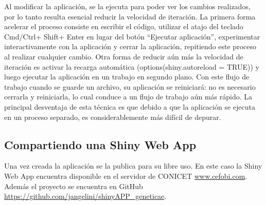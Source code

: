 Al modificar la aplicación, se la ejecuta para poder ver los cambios realizados, por lo tanto resulta esencial reducir la velocidad de iteración. La primera forma acelerar el proceso consiste en escribir el código, utilizar el atajo del teclado Cmd/Ctrl+ Shift+ Enter en lugar del botón ``Ejecutar aplicación'', experimentar interactivamente con la aplicación y cerrar la aplicación, repitiendo este proceso al realizar cualquier cambio. Otra forma de reducir aún más la velocidad de iteración es activar la recarga automática (options(shiny.autoreload = TRUE)) y luego ejecutar la aplicación en un trabajo en segundo plano. Con este flujo de trabajo cuando se guarde un archivo, su aplicación se reiniciará: no es necesario cerrarla y reiniciarla, lo cual conduce a un flujo de trabajo aún más rápido. La principal desventaja de esta técnica es que debido a que la aplicación se ejecuta en un proceso separado, es considerablemente más difícil de depurar.


\subsection{Compartiendo una Shiny Web App}

Una vez creada la aplicación se la publica para su libre uso. En este caso la Shiny Web App encuentra disponible en el servidor de CONICET \url{www.cefobi.com}. Además el proyecto se encuentra en GitHub \url{https://github.com/jangelini/shinyAPP_geneticae}. 

